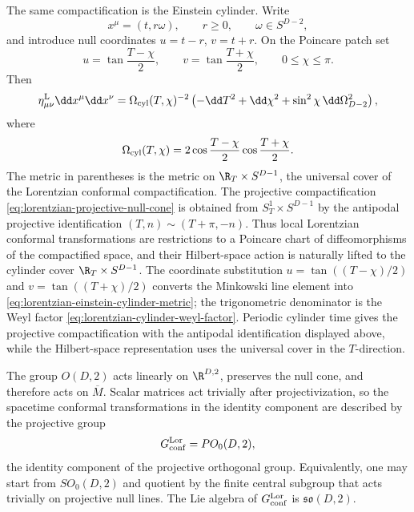 The same compactification is the Einstein cylinder.  Write
\[
  x^\mu=(t,r\omega),
  \qquad
  r\ge0,
  \qquad
  \omega\in S^{D-2},
\]
and introduce null coordinates \(u=t-r\), \(v=t+r\).  On the Poincare patch
set
\[
  u=\tan\frac{T-\chi}{2},
  \qquad
  v=\tan\frac{T+\chi}{2},
  \qquad
  0\le\chi\le\pi .
\]
Then
\begin{equation}
  \eta^{\rm L}_{\mu\nu}\dd x^\mu\dd x^\nu
  =
  \Omega_{\rm cyl}(T,\chi)^{-2}
  \left(
    -\dd T^2+\dd\chi^2+\sin^2\chi\,\dd\Omega_{D-2}^2
  \right),
  \label{eq:lorentzian-einstein-cylinder-metric}
\end{equation}
where
\begin{equation}
  \Omega_{\rm cyl}(T,\chi)
  =
  2\cos\frac{T-\chi}{2}\cos\frac{T+\chi}{2}.
  \label{eq:lorentzian-cylinder-weyl-factor}
\end{equation}
The metric in parentheses is the metric on \(\R_T\times S^{D-1}\), the
universal cover of the Lorentzian conformal compactification.  The projective
compactification \eqref{eq:lorentzian-projective-null-cone} is obtained from
\(S^1_T\times S^{D-1}\) by the antipodal projective identification
\((T,n)\sim(T+\pi,-n)\).  Thus local Lorentzian conformal transformations are
restrictions to a Poincare chart of diffeomorphisms of the compactified
space, and their Hilbert-space action is naturally lifted to the cylinder
cover \(\R_T\times S^{D-1}\).
The coordinate substitution \(u=\tan((T-\chi)/2)\) and
\(v=\tan((T+\chi)/2)\) converts the Minkowski line element into
\eqref{eq:lorentzian-einstein-cylinder-metric}; the trigonometric denominator
is the Weyl factor \eqref{eq:lorentzian-cylinder-weyl-factor}.  Periodic
cylinder time gives the projective compactification with the antipodal
identification displayed above, while the Hilbert-space representation uses
the universal cover in the \(T\)-direction.

\begin{definition}
\label{def:projective-lorentzian-conformal-group}
The group \(O(D,2)\) acts linearly on \(\R^{D,2}\), preserves the null cone,
and therefore acts on \(\overline M\).  Scalar matrices act trivially after
projectivization, so the spacetime conformal transformations in the identity
component are described by the projective group
\begin{equation}
  G_{\rm conf}^{\rm Lor}
  =
  PO_0(D,2),
  \label{eq:lorentzian-projective-conformal-group}
\end{equation}
the identity component of the projective orthogonal group.  Equivalently, one
may start from \(SO_0(D,2)\) and quotient by the finite central subgroup that
acts trivially on projective null lines.  The Lie algebra of
\(G_{\rm conf}^{\rm Lor}\) is \(\mathfrak{so}(D,2)\).
\end{definition}

